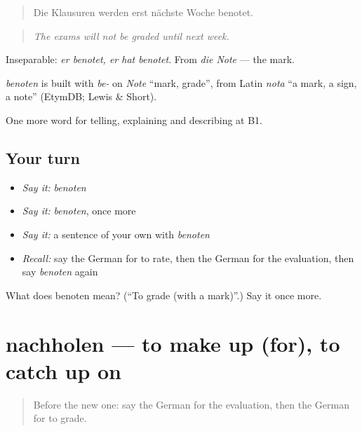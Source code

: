 \begin{quote}
Die Klausuren werden erst nächste Woche benotet.
\end{quote}

\begin{quote}
\emph{The exams will not be graded until next week.}
\end{quote}

Inseparable: \emph{er benotet, er hat benotet}. From \emph{die Note} — the mark.

\begin{cousinweb}
\emph{benoten} is built with \emph{be-} on \emph{Note} \textquotedblleft{}mark, grade\textquotedblright{}, from Latin \emph{nota} \textquotedblleft{}a mark, a sign, a note\textquotedblright{} (EtymDB; Lewis \& Short).
\end{cousinweb}

\begin{grammarlens}[title={What you've built}]
One more word for telling, explaining and describing at B1.
\end{grammarlens}

\subsection*{Your turn}
\begin{itemize}
\raggedright
  \item \emph{Say it:} \emph{benoten}
  \item \emph{Say it:} \emph{benoten}, once more
  \item \emph{Say it:} a sentence of your own with \emph{benoten}
  \item \emph{Recall:} say the German for to rate, then the German for the evaluation, then say \emph{benoten} again
\end{itemize}

\begin{tcolorbox}[breakable,colback=teal!4,colframe=teal!35!black,title={Before you move on}]
What does benoten mean? (\textquotedblleft{}To grade (with a mark)\textquotedblright{}.) Say it once more.
\end{tcolorbox}
\section[nachholen]{nachholen — to make up (for), to catch up on}

\label{lesson:GE-C379-nachholen}



\begin{quote}
Before the new one: say the German for the evaluation, then the German for to grade.
\end{quote}

